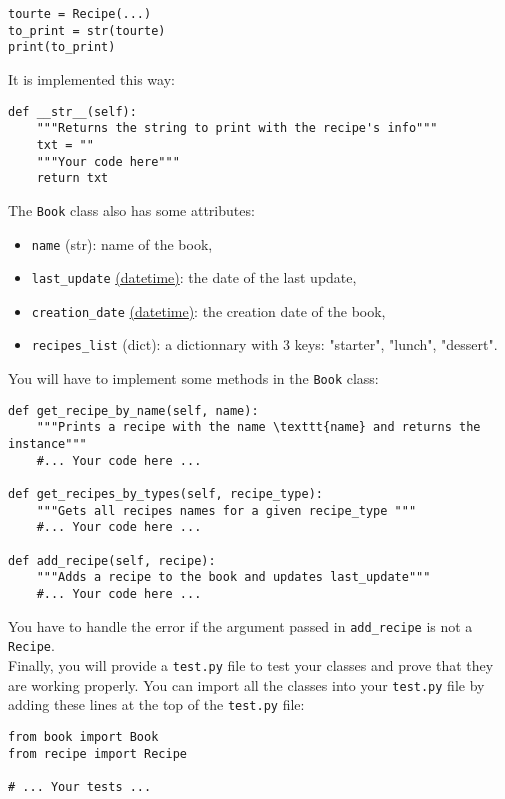 \newline
\begin{verbatim}
tourte = Recipe(...)
to_print = str(tourte)
print(to_print)
\end{verbatim}
\newline
\newline
It is implemented this way:\\
\newline
\begin{verbatim}
def __str__(self):
    """Returns the string to print with the recipe's info"""
    txt = ""
    """Your code here"""
    return txt
\end{verbatim}
\newline
The \texttt{Book} class also has some attributes:
\begin{itemize}
  \item \texttt{name} (str): name of the book,
  \item \texttt{last\_update} \href{https://docs.python.org/3/library/datetime.html}{(datetime)}: the date of the last update,
  \item \texttt{creation\_date} \href{https://docs.python.org/3/library/datetime.html}{(datetime)}: the creation date of the book,
  \item \texttt{recipes\_list} (dict): a dictionnary with 3 keys: "starter", "lunch", "dessert".
\end{itemize}
You will have to implement some methods in the \texttt{Book} class:\\
\newline
\begin{verbatim}
def get_recipe_by_name(self, name):
    """Prints a recipe with the name \texttt{name} and returns the instance"""
    #... Your code here ...

def get_recipes_by_types(self, recipe_type):
    """Gets all recipes names for a given recipe_type """
    #... Your code here ...

def add_recipe(self, recipe):
    """Adds a recipe to the book and updates last_update"""
    #... Your code here ...
\end{verbatim}
\newline
You have to handle the error if the argument passed in \texttt{add\_recipe} is not a \texttt{Recipe}.\\
\newline
Finally, you will provide a \texttt{test.py} file to test your classes and prove that they are working properly.
You can import all the classes into your \texttt{test.py} file by adding these lines at the top of the \texttt{test.py} file:\\
\newline
\begin{verbatim}
from book import Book
from recipe import Recipe

# ... Your tests ...
\end{verbatim}